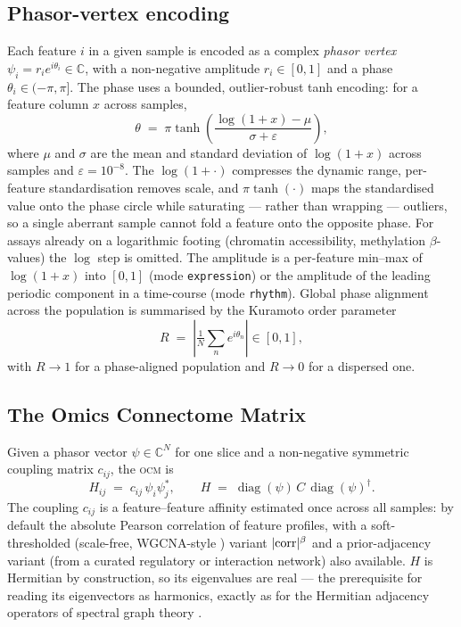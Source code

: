 \documentclass[preprint,12pt,amsmath,amssymb,superscriptaddress,floatfix]{revtex4-2}
\theoremstyle{definition}
\theoremstyle{plain}
\newcommand{\OCM}{\textsc{ocm}}
\begin{document}
\subsection{Phasor-vertex encoding}
\label{sec:theory-phasor}

Each feature $i$ in a given sample is encoded as a complex \emph{phasor vertex}
$\psi_i = r_i e^{i\theta_i}\in\mathbb{C}$, with a non-negative amplitude
$r_i\in[0,1]$ and a phase $\theta_i\in(-\pi,\pi]$. The phase uses a bounded,
outlier-robust tanh encoding: for a feature column $x$ across samples,
\begin{equation}
  \theta \;=\; \pi \tanh\!\left(\frac{\log(1+x)-\mu}{\sigma+\varepsilon}\right),
  \label{eq:phase}
\end{equation}
where $\mu$ and $\sigma$ are the mean and standard deviation of $\log(1+x)$
across samples and $\varepsilon=10^{-8}$. The $\log(1{+}\cdot)$ compresses the
dynamic range, per-feature standardisation removes scale, and $\pi\tanh(\cdot)$
maps the standardised value onto the phase circle while saturating --- rather
than wrapping --- outliers, so a single aberrant sample cannot fold a feature
onto the opposite phase. For assays already on a logarithmic footing (chromatin
accessibility, methylation $\beta$-values) the $\log$ step is omitted. The
amplitude is a per-feature min--max of $\log(1+x)$ into $[0,1]$ (mode
\texttt{expression}) or the amplitude of the leading periodic component in a
time-course (mode \texttt{rhythm}). Global phase alignment across the population
is summarised by the Kuramoto order parameter \citep{kuramoto1975}
\begin{equation}
  R \;=\; \left|\tfrac{1}{N}\textstyle\sum_n e^{i\theta_n}\right| \in [0,1],
  \label{eq:kuramoto}
\end{equation}
with $R\to1$ for a phase-aligned population and $R\to0$ for a dispersed one.

\subsection{The Omics Connectome Matrix}
\label{sec:theory-ocm}

Given a phasor vector $\psi\in\mathbb{C}^N$ for one slice and a non-negative
symmetric coupling matrix $c_{ij}$, the \OCM{} is
\begin{equation}
  H_{ij} \;=\; c_{ij}\,\psi_i\psi_j^{*},
  \qquad
  H \;=\; \operatorname{diag}(\psi)\,C\,\operatorname{diag}(\psi)^{\dagger}.
  \label{eq:ocm}
\end{equation}
The coupling $c_{ij}$ is a feature--feature affinity estimated once across all
samples: by default the absolute Pearson correlation of feature profiles, with a
soft-thresholded (scale-free, WGCNA-style \citep{langfelder2008wgcna}) variant
$|{\rm corr}|^{\beta}$ and a prior-adjacency variant (from a curated regulatory
or interaction network) also available. $H$ is Hermitian by construction, so its
eigenvalues are real --- the prerequisite for reading its eigenvectors as
harmonics, exactly as for the Hermitian adjacency operators of spectral graph
theory \citep{guo2017hermitian, chung1997spectral}.
\end{document}
